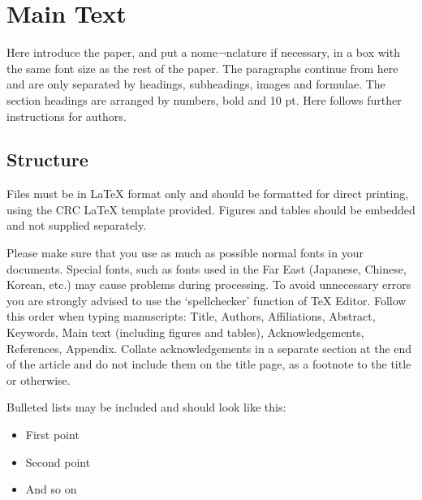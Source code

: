 \documentclass[3p,times,procedia]{elsarticle}
\begin{document}



\section{Main Text}
\label{main}

Here introduce the paper, and put a nome¬nclature if necessary, in a box with the same font size as the rest of the paper. The paragraphs continue from here and are only separated by headings, subheadings, images and formulae. The section headings are arranged by numbers, bold and 10 pt. Here follows further instructions for authors.

\begin{nomenclature}
\begin{deflist}[A]
\end{deflist}
\end{nomenclature}

\subsection{ Structure}
Files must be in LaTeX format only and should be formatted for direct printing, using the CRC LaTeX template provided. Figures and tables should be embedded and not supplied separately. 

Please make sure that you use as much as possible normal fonts in your documents. Special fonts, such as fonts used in the Far East (Japanese, Chinese, Korean, etc.) may cause problems during processing. To avoid unnecessary errors you are strongly advised to use the `spellchecker' function of TeX Editor. Follow this order when typing manuscripts: Title, Authors, Affiliations, Abstract, Keywords, Main text (including figures and tables), Acknowledgements, References, Appendix. Collate acknowledgements in a separate section at the end of the article and do not include them on the title page, as a footnote to the title or otherwise.

Bulleted lists may be included and should look like this:
\begin{itemize}[]
\item First point
\item Second point
\item And so on
\end{itemize}
\end{document}
